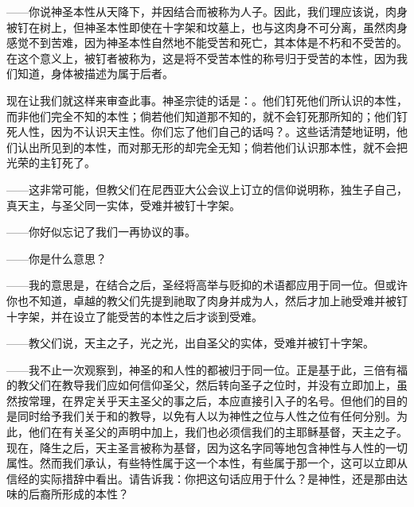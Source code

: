 ——你说神圣本性从天降下，并因结合而被称为人子。因此，我们理应该说，肉身被钉在树上，但神圣本性即使在十字架和坟墓上，也与这肉身不可分离，虽然肉身感觉不到苦难，因为神圣本性自然地不能受苦和死亡，其本体是不朽和不受苦的。在这个意义上，被钉者被称为，这是将不受苦本性的称号归于受苦的本性，因为我们知道，身体被描述为属于后者。\par

现在让我们就这样来审查此事。神圣宗徒的话是：。他们钉死他们所认识的本性，而非他们完全不知的本性；倘若他们知道那不知的，就不会钉死那所知的；他们钉死人性，因为不认识天主性。你们忘了他们自己的话吗？。这些话清楚地证明，他们认出所见到的本性，而对那无形的却完全无知；倘若他们认识那本性，就不会把光荣的主钉死了。\par

——这非常可能，但教父们在尼西亚大公会议上订立的信仰说明称，独生子自己，真天主，与圣父同一实体，受难并被钉十字架。\par

——你好似忘记了我们一再协议的事。\par

——你是什么意思？\par

——我的意思是，在结合之后，圣经将高举与贬抑的术语都应用于同一位。但或许你也不知道，卓越的教父们先提到祂取了肉身并成为人，然后才加上祂受难并被钉十字架，并在设立了能受苦的本性之后才谈到受难。\par

——教父们说，天主之子，光之光，出自圣父的实体，受难并被钉十字架。\par

——我不止一次观察到，神圣的和人性的都被归于同一位。正是基于此，三倍有福的教父们在教导我们应如何信仰圣父，然后转向圣子之位时，并没有立即加上，虽然按常理，在界定关乎天主圣父的事之后，本应直接引入子的名号。但他们的目的是同时给予我们关于和的教导，以免有人以为神性之位与人性之位有任何分别。为此，他们在有关圣父的声明中加上，我们也必须信我们的主耶稣基督，天主之子。现在，降生之后，天主圣言被称为基督，因为这名字同等地包含神性与人性的一切属性。然而我们承认，有些特性属于这一个本性，有些属于那一个，这可以立即从信经的实际措辞中看出。请告诉我：你把这句话应用于什么？是神性，还是那由达味的后裔所形成的本性？\par


